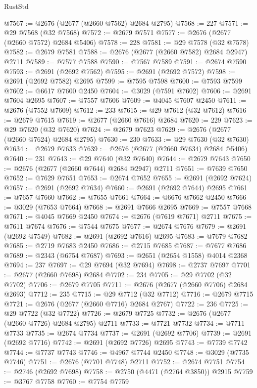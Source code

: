 \begin{lexlean}{RustStd}
\begin{coremodule}
{\begin{coremodule}
{{{{{{{{{{{{{{{{{{{{{{{{{{{{{{{{{{{{{{{{{{{{{{{{{{{{{{{@7567 := @2676 (@2677 (@2660 @7562) @2684 @2795)
@7568 := 227
@7571 := @29 @7568 (@32 @7568)
@7572 := @2679 @7571
@7577 := @2676 (@2677 (@2660 @7572) @2684 @5406)
@7578 := 228
@7581 := @29 @7578 (@32 @7578)
@7582 := @2679 @7581
@7588 := @2676 (@2677 (@2660 @7582) @2684 @2947) @2711
@7589 := @7577 @7588
@7590 := @7567 @7589
@7591 := @2674 @7590
@7593 := @2691 (@2692 @7562)
@7595 := @2691 (@2692 @7572)
@7598 := @2691 (@2692 @7582) @2695
@7599 := @7595 @7598
@7600 := @7593 @7599
@7602 := @6617 @7600 @2450
@7604 := @3029 (@7591 @7602)
@7606 := @2691 @7604 @2695
@7607 := @7557 @7606
@7609 := @4045 @7607 @2450
@7611 := @2676 (@7552 @7609)
@7612 := 233
@7615 := @29 @7612 (@32 @7612)
@7616 := @2679 @7615
@7619 := @2677 (@2660 @7616) @2684
@7620 := 229
@7623 := @29 @7620 (@32 @7620)
@7624 := @2679 @7623
@7629 := @2676 (@2677 (@2660 @7624) @2684 @2795)
@7630 := 230
@7633 := @29 @7630 (@32 @7630)
@7634 := @2679 @7633
@7639 := @2676 (@2677 (@2660 @7634) @2684 @5406)
@7640 := 231
@7643 := @29 @7640 (@32 @7640)
@7644 := @2679 @7643
@7650 := @2676 (@2677 (@2660 @7644) @2684 @2947) @2711
@7651 := @7639 @7650
@7652 := @7629 @7651
@7653 := @2674 @7652
@7655 := @2691 (@2692 @7624)
@7657 := @2691 (@2692 @7634)
@7660 := @2691 (@2692 @7644) @2695
@7661 := @7657 @7660
@7662 := @7655 @7661
@7664 := @6676 @7662 @2450
@7666 := @3029 (@7653 @7664)
@7668 := @2691 @7666 @2695
@7669 := @7557 @7668
@7671 := @4045 @7669 @2450
@7674 := @2676 (@7619 @7671) @2711
@7675 := @7611 @7674
@7676 := @7544 @7675
@7677 := @2674 @7676
@7679 := @2691 (@2692 @7549)
@7682 := @2691 (@2692 @7616) @2695
@7683 := @7679 @7682
@7685 := @2719 @7683 @2450
@7686 := @2715 @7685
@7687 := @7677 @7686
@7689 := @2343 (@6754 @7687)
@7693 := @2651 (@2654 @1558) @4014 @2368
@7694 := 237
@7697 := @29 @7694 (@32 @7694)
@7698 := @2737 @7697
@7701 := @2677 (@2660 @7698) @2684
@7702 := 234
@7705 := @29 @7702 (@32 @7702)
@7706 := @2679 @7705
@7711 := @2676 (@2677 (@2660 @7706) @2684 @2693)
@7712 := 235
@7715 := @29 @7712 (@32 @7712)
@7716 := @2679 @7715
@7721 := @2676 (@2677 (@2660 @7716) @2684 @2767)
@7722 := 236
@7725 := @29 @7722 (@32 @7722)
@7726 := @2679 @7725
@7732 := @2676 (@2677 (@2660 @7726) @2684 @2795) @2711
@7733 := @7721 @7732
@7734 := @7711 @7733
@7735 := @2674 @7734
@7737 := @2691 (@2692 @7706)
@7739 := @2691 (@2692 @7716)
@7742 := @2691 (@2692 @7726) @2695
@7743 := @7739 @7742
@7744 := @7737 @7743
@7746 := @4967 @7744 @2450
@7748 := @3029 (@7735 @7746)
@7751 := @2676 (@7701 @7748) @2711
@7752 := @2674 @7751
@7754 := @2746 (@2692 @7698)
@7758 := @2750 (@4471 (@2764 @3850)) @2915
@7759 := @3767 @7758
@7760 := @7754 @7759
}}}}}}}}}}}}}}}}}}}}}}}}}}}}}}}}}}}}}}}}}}}}}}}}}}}}}}}
\end{coremodule}}
\end{coremodule}
\end{lexlean}
